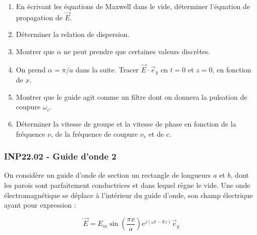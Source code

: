 \begin{center}
\end{center}


\begin{enumerate}
    \item En écrivant les équations de Maxwell dans le vide, déterminer l'équation de propagation de $\overrightarrow{E}$.
    \item Déterminer la relation de dispersion.
    \item Montrer que $\alpha$ ne peut prendre que certaines valeurs discrètes.
    \item On prend $\alpha = \pi / a$ dans la suite. Tracer $\overrightarrow{E} \cdot \vec{e}_y$ en $t = 0$ et $z = 0$, en fonction de $x$.
    \item Montrer que le guide agit comme un filtre dont on donnera la pulsation de coupure $\omega_c$.
    \item Déterminer la vitesse de groupe et la vitesse de phase en fonction de la fréquence $\nu$, de la fréquence de coupure $\nu_c$ et de $c$.
\end{enumerate}

\subsubsection*{INP22.02 - Guide d'onde 2  \lesdeux}

\begin{minipage}[t]{0.65\textwidth} %

On considère un guide d'onde de section un rectangle de longueurs $a$ et $b$, dont les parois sont parfaitement conductrices et dans lequel règne le vide. Une onde électromagnétique se déplace à l'intérieur du guide d'onde, son champ électrique ayant pour expression :

\[
\overrightarrow{E} = E_m \sin\left(\frac{\pi x}{a}\right) e^{j(\omega t - kz)} \overrightarrow{e}_y
\]

\end{minipage}
\hfill %
\begin{minipage}[t]{0.24\textwidth} %
~
\vspace{-2em}

\end{minipage}

